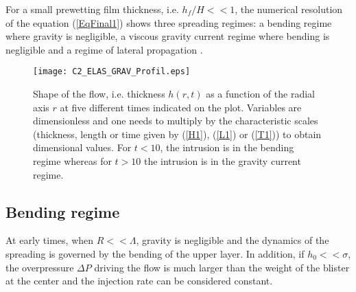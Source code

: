 For a small prewetting film thickness, i.e.  $h_f/H<<1$, the numerical
resolution  of the  equation  (\ref{EqFinal1})  shows three  spreading
regimes:  a bending  regime  where gravity  is  negligible, a  viscous
gravity current  regime where  bending is negligible  and a  regime of
lateral                                                    propagation
\citep{Michaut:2011kg,Bunger:2011cb,Lister:2013ia}.

\begin{figure}[h!]
  \begin{center}
    \graphicspath{ {/Users/thorey/Documents/These/Manuscript/Figure/Chapter2/} }
    \texttt{[image: C2\_ELAS\_GRAV\_Profil.eps]}
    \caption{Shape of the flow, i.e.  thickness $h(r,t)$ as a function
      of the radial axis $r$ at  five different times indicated on the
      plot. Variables are  dimensionless and one needs  to multiply by
      the characteristic  scales (thickness,  length or time  given by
      (\ref{H1}),  (\ref{L1})  or  (\ref{T1})) to  obtain  dimensional
      values.   For $t<10$,  the intrusion  is in  the bending  regime
      whereas  for $t>10$  the  intrusion is  in  the gravity  current
      regime.}
    \label{C2_ELAS_GRAV_Profil}
  \end{center}
\end{figure}

\subsection{Bending regime}
\label{C2-sec:bending-regime}

At  early times,  when  $R<<\Lambda$, gravity  is  negligible and  the
dynamics of  the spreading  is governed  by the  bending of  the upper
layer.   In addition,  if $h_0<<\sigma$,  the overpressure  $\Delta P$
driving the flow is much larger than  the weight of the blister at the
center and the injection rate can be considered constant.

